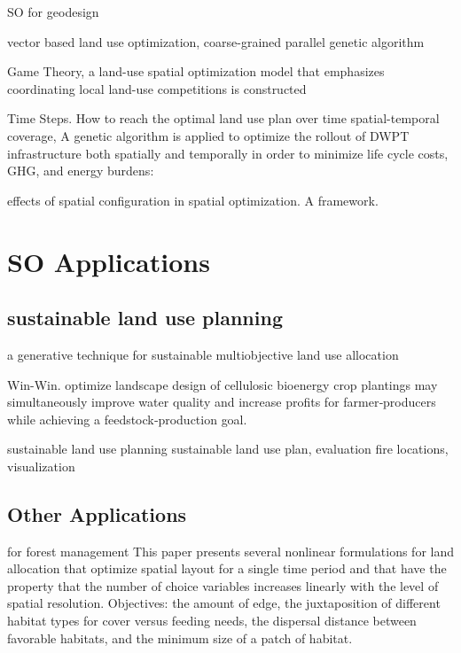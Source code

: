 \documentclass[12pt]{caltech_thesis}
\begin{document}
\begin{bibunit}
\citep{eikelboom2015spatial} SO for geodesign


\citep{cao2013coarse} vector based land use optimization, coarse-grained parallel genetic algorithm

\cite{liu2015land} Game Theory, a land-use spatial optimization model that emphasizes coordinating local land-use competitions is constructed

\citep{Cao2019a} Time Steps. How to reach the optimal land use plan over time
\citep{bi2019life}spatial-temporal coverage, A genetic algorithm is applied to optimize the rollout of DWPT infrastructure both spatially and temporally in order to minimize life cycle costs, GHG, and energy burdens:

\citep{zhu2019effects} effects of spatial configuration in spatial optimization. A framework. 


\section{SO Applications}
\subsection{sustainable land use planning}
\citep{ligmann2008spatial} a generative technique for sustainable multiobjective land use allocation

\citep{parish2012multimetric} Win-Win. optimize landscape design of cellulosic bioenergy crop plantings may simultaneously improve water quality and increase profits for farmer‐producers while achieving a feedstock‐production goal. 

\citep{cao20171} sustainable land use planning
\citep{yao2019evaluation} sustainable land use plan, evaluation
\citep{yao2019evaluation} fire locations, visualization



\subsection{Other Applications}
\citep{hof1992spatial} for forest management
This paper presents several nonlinear formulations for land allocation that optimize spatial layout for a single time period and that have the property that the number of choice variables increases linearly with the level of spatial resolution.
Objectives: the amount of edge, the juxtaposition of different habitat types for cover versus feeding needs, the dispersal distance between favorable habitats, and the minimum size of a patch of habitat. 


\end{bibunit}
\end{document}
